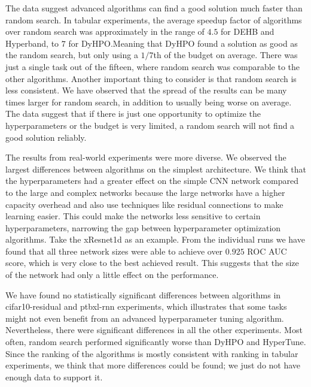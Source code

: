 The data suggest advanced algorithms can find a good solution much faster than random search. In tabular experiments, the average speedup factor of algorithms over random search was approximately in the range of $4.5$ for DEHB and Hyperband, to $7$ for DyHPO.\@ Meaning that DyHPO found a solution as good as the random search, but only using a $1/7$th of the budget on average. There was just a single task out of the fifteen, where random search was comparable to the other algorithms. Another important thing to consider is that random search is less consistent. We have observed that the spread of the results can be many times larger for random search, in addition to usually being worse on average. The data suggest that if there is just one opportunity to optimize the hyperparameters or the budget is very limited, a random search will not find a good solution reliably.

The results from real-world experiments were more diverse. We observed the largest differences between algorithms on the simplest architecture. We think that the hyperparameters had a greater effect on the simple CNN network compared to the large and complex networks because the large networks have a higher capacity overhead and also use techniques like residual connections to make learning easier. This could make the networks less sensitive to certain hyperparameters, narrowing the gap between hyperparameter optimization algorithms. Take the xResnet1d as an example. From the individual runs we have found that all three network sizes were able to achieve over $0.925$ ROC AUC score, which is very close to the best achieved result. This suggests that the size of the network had only a little effect on the performance.

We have found no statistically significant differences between algorithms in cifar10-residual and ptbxl-rnn experiments, which illustrates that some tasks might not even benefit from an advanced hyperparameter tuning algorithm. Nevertheless, there were significant differences in all the other experiments. Most often, random search performed significantly worse than DyHPO and HyperTune. Since the ranking of the algorithms is mostly consistent with ranking in tabular experiments, we think that more differences could be found; we just do not have enough data to support it.





